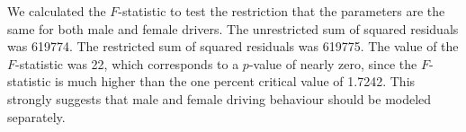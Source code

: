 



We calculated the $F$-statistic to test the restriction 
that the parameters are the same for both male and female drivers. 
The unrestricted sum of squared residuals was 619774. 
The restricted sum of squared residuals was 619775. 
The value of the $F$-statistic was 22, 
which corresponds to a $p$-value of nearly zero, since the $F$-statistic is much higher than 
 the one percent critical value of 1.7242. 
This strongly suggests that male and female driving behaviour should be modeled separately. 

